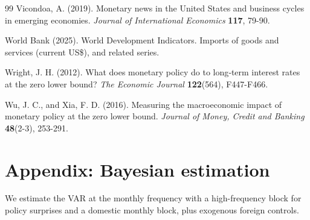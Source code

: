 \documentclass[12pt, reqno]{article}
\begin{document}
\begin{thebibliography}{99}
\bibitem{} \hypertarget{Vicondoa (2019)}{} Vicondoa, A. (2019). Monetary news in the United States and business cycles in emerging economies. \textit{Journal of International Economics} \textbf{117}, 79-90.

\bibitem{} \hypertarget{World Bank WDI}{}
World Bank (2025). World Development Indicators. Imports of goods and services (current US\$), and related series.

\bibitem{} \hypertarget{Wright (2012)}{}Wright, J. H. (2012). What does monetary policy do to long‐term interest rates at the zero lower bound? \textit{The Economic Journal} \textbf{122}(564), F447-F466.

\bibitem{} \hypertarget{Wu and Xia (2016)}{} Wu, J. C., and Xia, F. D. (2016). Measuring the macroeconomic impact of monetary policy at the zero lower bound. \textit{Journal of Money, Credit and Banking} \textbf{48}(2-3), 253-291.

\end{thebibliography}
\newpage

\appendix

\section{Appendix: Bayesian estimation}
\setcounter{equation}{0}
\hypertarget{Appendix A}{}

We estimate the VAR at the monthly frequency with a high-frequency block for policy surprises and a domestic monthly block, plus exogenous foreign controls.
\end{document}
